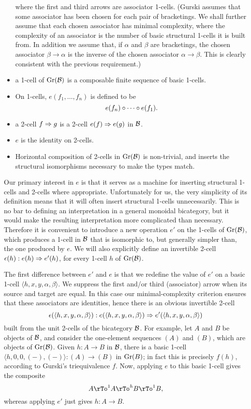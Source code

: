 \documentclass{robinthesisdraft}
\begin{document}
\begin{itemize}
\begin{diagram}
		\end{diagram}
		where the first and third arrows are associator 1-cells.%
			(Gurski assumes that some associator
			has been chosen for each pair of bracketings. We shall further assume
			that each chosen associator has minimal complexity, where the complexity of
			an associator is the number of basic structural 1-cells it is built
			from. In addition we assume that, if $\alpha$ and $\beta$ are bracketings,
			the chosen associator $\beta\to\alpha$ is the inverse of the
			chosen associator $\alpha\to\beta$. This is clearly consistent with the
			previous requirement.)
	\item a 1-cell of $\Gr(\B)$ is a composable finite sequence of basic 1-cells.
	\item On 1-cells, $e(f_{1},  \dots, f_{n})$ is defined to be
	\[
		e(f_{n}) \o \cdots \o e(f_{1}).
	\]
	\item a 2-cell $f \To g$ is a 2-cell $e(f) \To e(g)$ in $\B$.
	\item $e$ is the identity on 2-cells.
	\item Horizontal composition of 2-cells in $\Gr(\B)$ is non-trivial, and
		inserts the structural isomorphisms necessary to make the types match.
\end{itemize}
Our primary interest in $e$ is that it serves as a machine for inserting
structural 1-cells and 2-cells where appropriate. Unfortunately for us,
the very simplicity of its definition means that it will often insert
structural 1-cells unnecessarily. This is no bar to defining an interpretation
in a general monoidal bicategory, but it would make the resulting interpretation
more complicated than necessary. Therefore it is convenient to introduce
a new operation $e'$ on the 1-cells of $\Gr(\B)$, which produces a
1-cell in $\B$ that is isomorphic to, but generally simpler than, the
one produced by $e$. We will also explicitly define an invertible
2-cell $\epsilon(h): e(h) \To e'(h)$, for every 1-cell $h$ of $\Gr(\B)$.

The first difference between $e'$ and $e$ is that we redefine the value of
$e'$ on a basic 1-cell $\langle h,x,y,\alpha,\beta \rangle$. We suppress the
first and/or third (associator) arrow when its source and target are equal.
In this case our minimal-complexity criterion ensures that these associators
are identities, hence there is an obvious invertible 2-cell
\[
	\epsilon(\langle h,x,y,\alpha,\beta \rangle):
		e(\langle h,x,y,\alpha,\beta \rangle) \To e'(\langle h,x,y,\alpha,\beta \rangle)
\]
built from the unit 2-cells of the bicategory $\B$.
%
For example, let $A$ and $B$ be objects
of $\B$, and consider the one-element sequences $(A)$ and $(B)$, which are
objects of $\Gr(\B)$. Given $h: A\to B$ in $\B$, there is a basic 1-cell
$\langle h,0,0,(-),(-) \rangle: (A)\to(B)$ in $\Gr(B)$; in fact this is
precisely $f(h)$, according to Gurski's triequivalence $f$. Now, applying
$e$ to this basic 1-cell gives the composite
\[
	A \rTo^{1} A \rTo^{h} B \rTo^{1} B,
\]
whereas applying $e'$ just gives $h: A\to B$.
\end{document}
